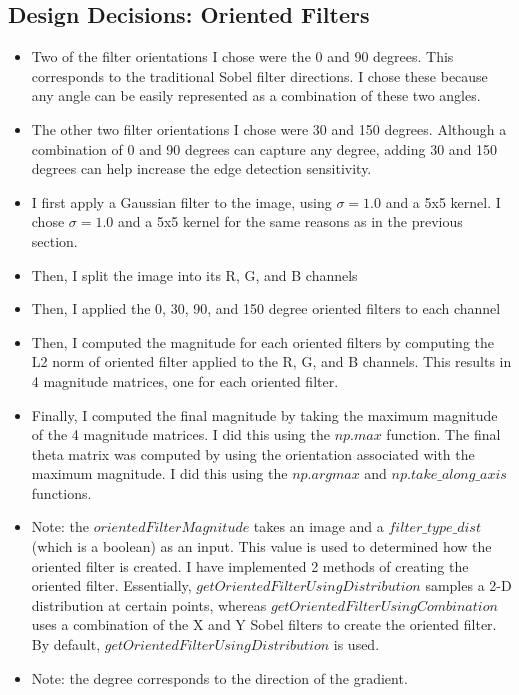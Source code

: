 \documentclass[12pt]{article}
\begin{document}
\subsection{Design Decisions: Oriented Filters}
\begin{itemize}
    \item Two of the filter orientations I chose were the 0 and 90 degrees. This corresponds to the traditional Sobel filter directions. I chose these because any angle can be easily represented as a combination of these two angles. 
    \item The other two filter orientations I chose were 30 and 150 degrees. Although a combination of 0 and 90 degrees can capture any degree, adding 30 and 150 degrees can help increase the edge detection sensitivity.
    \item I first apply a Gaussian filter to the image, using $\sigma = 1.0$ and a 5x5 kernel. I chose $\sigma = 1.0$ and a 5x5 kernel for the same reasons as in the previous section.
    \item Then, I split the image into its R, G, and B channels
    \item Then, I applied the 0, 30, 90, and 150 degree oriented filters to each channel
    \item Then, I computed the magnitude for each oriented filters by computing the L2 norm of oriented filter applied to the R, G, and B channels. This results in 4 magnitude matrices, one for each oriented filter.
    \item Finally, I computed the final magnitude by taking the maximum magnitude of the 4 magnitude matrices. I did this using the $np.max$ function. The final theta matrix was computed by using the orientation associated with the maximum magnitude. I did this using the $np.argmax$ and $np.take\_along\_axis$ functions.
    \item Note: the $orientedFilterMagnitude$ takes an image and a $filter\_type\_dist$ (which is a boolean) as an input. This value is used to determined how the oriented filter is created. I have implemented 2 methods of creating the oriented filter. Essentially, $getOrientedFilterUsingDistribution$ samples a 2-D distribution at certain points, whereas $getOrientedFilterUsingCombination$ uses a combination of the X and Y Sobel filters to create the oriented filter. By default, $getOrientedFilterUsingDistribution$ is used.
    \item Note: the degree corresponds to the direction of the gradient.
\end{itemize}
\end{document}

